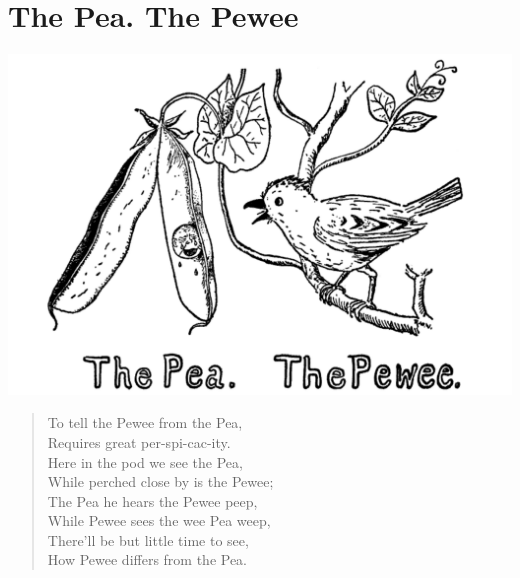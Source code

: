 \documentclass[letterpaper, 10pt, openany]{memoir}
\begin{document}
\chapter{The Pea. The Pewee}
\includegraphics[width=1\textwidth]{f-p06.png}
\vspace{\onelineskip}
\begin{verse}\huge
To tell the Pewee from the Pea,\\
Requires great per-spi-cac-ity.\\
Here in the pod we see the Pea,\\
While perched close by is the Pewee;\\
The Pea he hears the Pewee peep,\\
While Pewee sees the wee Pea weep,\\
There'll be but little time to see,\\
How Pewee differs from the Pea.\\
\end{verse}
\vspace{\onelineskip}
\end{document}
